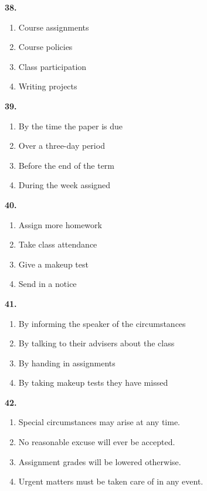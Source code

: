 \documentclass[12pt]{article}
\begin{document}
\noindent\textbf{38.}
\begin{enumerate}[label=(\Alph*),leftmargin=*,itemsep=0.2em]
\item Course assignments
\item Course policies
\item Class participation
\item Writing projects
\end{enumerate}
\par
\vspace{0.25\baselineskip}
\noindent\textbf{39.}
\begin{enumerate}[label=(\Alph*),leftmargin=*,itemsep=0.2em]
\item By the time the paper is due
\item Over a three-day period
\item Before the end of the term
\item During the week assigned
\end{enumerate}
\par
\vspace{0.25\baselineskip}
\noindent\textbf{40.}
\begin{enumerate}[label=(\Alph*),leftmargin=*,itemsep=0.2em]
\item Assign more homework
\item Take class attendance
\item Give a makeup test
\item Send in a notice
\end{enumerate}
\par
\vspace{0.25\baselineskip}
\noindent\textbf{41.}
\begin{enumerate}[label=(\Alph*),leftmargin=*,itemsep=0.2em]
\item By informing the speaker of the circumstances
\item By talking to their advisers about the class
\item By handing in assignments
\item By taking makeup tests they have missed
\end{enumerate}
\par
\vspace{0.25\baselineskip}
\noindent\textbf{42.}
\begin{enumerate}[label=(\Alph*),leftmargin=*,itemsep=0.2em]
\item Special circumstances may arise at any time.
\item No reasonable excuse will ever be accepted.
\item Assignment grades will be lowered otherwise.
\item Urgent matters must be taken care of in any event.
\end{enumerate}
\end{document}
